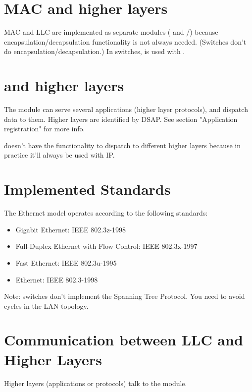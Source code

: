 \section{MAC and higher layers}

MAC and LLC are implemented as separate modules ( and
/) because encapsulation/decapsulation functionality
is not always needed. (Switches don't do encapsulation/decapsulation.)
In switches,  is used with .


\section{ and higher layers}

The  module can serve several applications (higher layer protocols),
and dispatch data to them. Higher layers are identified by DSAP.
See section "Application registration" for more info.

 doesn't have the functionality to dispatch to different
higher layers because in practice it'll always be used with IP.


\section{Implemented Standards}

The Ethernet model operates according to the following standards:

\begin{itemize}
  \item Gigabit Ethernet: IEEE 802.3z-1998
  \item Full-Duplex Ethernet with Flow Control: IEEE 802.3x-1997
  \item Fast Ethernet: IEEE 802.3u-1995
  \item Ethernet: IEEE 802.3-1998
\end{itemize}

Note: switches don't implement the Spanning Tree Protocol. You need to
avoid cycles in the LAN topology.


\section{Communication between LLC and Higher Layers}

Higher layers (applications or protocols) talk to the  module.

